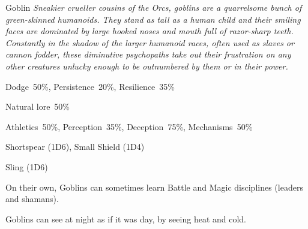 \newpage



\begin{monsterbox}{Goblin}
	\textit{Sneakier crueller cousins of the Orcs, goblins are a quarrelsome bunch of green-skinned humanoids. They stand as tall as a human child and their smiling faces are dominated by large hooked noses and mouth full of razor-sharp teeth. Constantly in the shadow of the larger humanoid races, often used as slaves or cannon fodder, these diminutive psychopaths take out their frustration on any other creatures unlucky enough to be outnumbered by them or in their power.}\\
	\rpghline
	\basics[%
        hitpoints  = 9, %
	majorwound = 5,
	damagemodifier = 0,
	powerpoints = 10,
	movementrate = 15m,
	armor = Leather (2AP),
	plunderrating = 1
	]
	\rpghline%
	\stats[ %
		STR = 2D6+3 (10),
		CON = 2D6+3 (10),
		DEX = 5D6   (17),
		SIZ = 2D6   (7),
		INT = 3D6   (11),
		POW = 2D6+3 (10),
		CHA = 2D6   (7)
	]
	\rpghline%
	\begin{rpg-monsteraction}[Resistances]
		Dodge~50\%, Persistence~20\%, Resilience~35\%
	\end{rpg-monsteraction}
	\begin{rpg-monsteraction}[Knowledge]
    		Natural lore~50\%
	\end{rpg-monsteraction}
	\begin{rpg-monsteraction}[Practical]
		Athletics~50\%, Perception~35\%, Deception~75\%, Mechanisms~50\%
	\end{rpg-monsteraction}
	\begin{rpg-monsteraction}
		Shortspear (1D6), Small Shield (1D4)
	\end{rpg-monsteraction}
	\begin{rpg-monsteraction}
		Sling (1D6)
	\end{rpg-monsteraction}
	\begin{rpg-monsteraction}[Supernatural]
		On their own, Goblins can sometimes learn Battle and Magic disciplines (leaders and shamans).
	\end{rpg-monsteraction}
	\begin{rpg-monsteraction}[Thermoception]
		Goblins can see at night as if it was day, by seeing heat and cold.
	\end{rpg-monsteraction}

\end{monsterbox}

